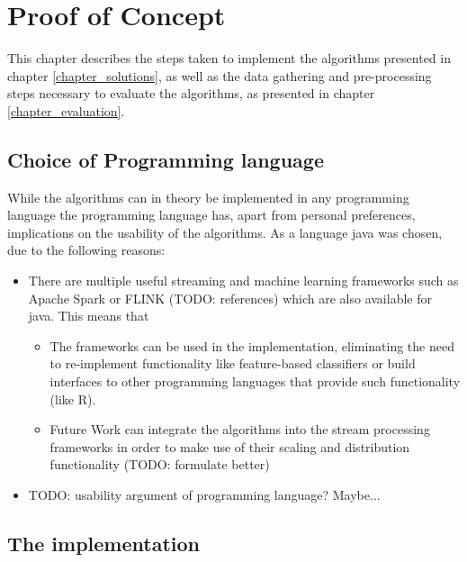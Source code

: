 \chapter{Proof of Concept}
\label{chapter_proofOfConcept}

\ifpdf
    \graphicspath{{Chapter5/Figs/Raster/}{Chapter5/Figs/PDF/}{Chapter5/Figs/}}
\else
    \graphicspath{{Chapter5/Figs/Vector/}{Chapter5/Figs/}}
\fi

This chapter describes the steps taken to implement the algorithms presented in chapter \ref{chapter_solutions}, as well as the data gathering and pre-processing steps necessary to evaluate the algorithms, as presented in chapter \ref{chapter_evaluation}.

\section{Choice of Programming language}
While the algorithms can in theory be implemented in any programming language the programming language has, apart from personal preferences, implications on the usability of the algorithms. As a language java was chosen, due to the following reasons:

\begin{itemize}
	\item There are multiple useful streaming and machine learning frameworks such as Apache Spark or FLINK (TODO: references) which are also available for java. This means that
	\begin{itemize}
		\item The frameworks can be used in the implementation, eliminating the need to re-implement functionality like feature-based classifiers or build interfaces to other programming languages that provide such functionality (like R).
		\item Future Work can integrate the algorithms into the stream processing frameworks in order to make use of their scaling and distribution functionality (TODO: formulate better)
	\end{itemize}
	\item TODO: usability argument of programming language? Maybe...
\end{itemize}

\section{The implementation}

